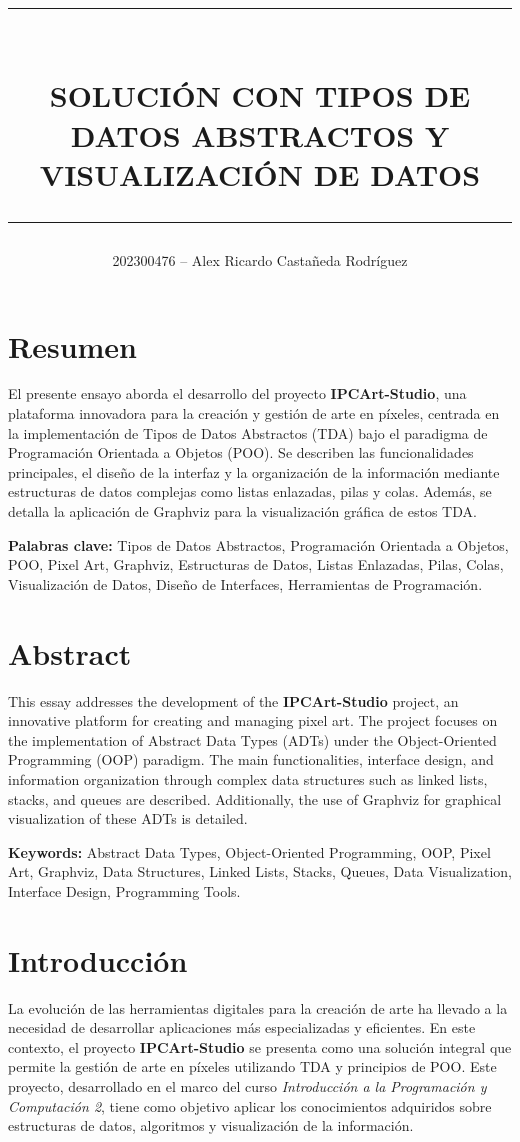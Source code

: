 \documentclass[letterpaper,12pt]{article}
\title{
    \rule{\textwidth}{0.4pt} \\
    \vspace{0.4cm}
    \textbf{SOLUCIÓN CON TIPOS DE DATOS ABSTRACTOS Y VISUALIZACIÓN DE DATOS} \\
    \rule{\textwidth}{0.4pt}
}
\author{202300476 – Alex Ricardo Castañeda Rodríguez}
\date{}
\begin{document}
\maketitle
\vspace{1cm}

\begin{multicols}{2}

    \section*{Resumen}
    El presente ensayo aborda el desarrollo del proyecto \textbf{IPCArt-Studio}, una plataforma innovadora para la creaci\'on y gesti\'on de arte en p\'ixeles, centrada en la implementaci\'on de Tipos de Datos Abstractos (TDA) bajo el paradigma de Programaci\'on Orientada a Objetos (POO). Se describen las funcionalidades principales, el dise\~no de la interfaz y la organizaci\'on de la informaci\'on mediante estructuras de datos complejas como listas enlazadas, pilas y colas. Adem\'as, se detalla la aplicaci\'on de Graphviz para la visualizaci\'on gr\'afica de estos TDA.

    \textbf{Palabras clave:} Tipos de Datos Abstractos, Programación Orientada a Objetos, POO, Pixel Art, Graphviz, Estructuras de Datos, Listas Enlazadas, Pilas, Colas, Visualización de Datos, Diseño de Interfaces, Herramientas de Programación.

    \columnbreak

    \section*{Abstract}
    This essay addresses the development of the \textbf{IPCArt-Studio} project, an innovative platform for creating and managing pixel art. The project focuses on the implementation of Abstract Data Types (ADTs) under the Object-Oriented Programming (OOP) paradigm. The main functionalities, interface design, and information organization through complex data structures such as linked lists, stacks, and queues are described. Additionally, the use of Graphviz for graphical visualization of these ADTs is detailed.

    \textbf{Keywords:} Abstract Data Types, Object-Oriented Programming, OOP, Pixel Art, Graphviz, Data Structures, Linked Lists, Stacks, Queues, Data Visualization, Interface Design, Programming Tools.


    \newpage

    \section*{Introducci\'on}
La evoluci\'on de las herramientas digitales para la creaci\'on de arte ha llevado a la necesidad de desarrollar aplicaciones m\'as especializadas y eficientes. En este contexto, el proyecto \textbf{IPCArt-Studio} se presenta como una soluci\'on integral que permite la gesti\'on de arte en p\'ixeles utilizando TDA y principios de POO. Este proyecto, desarrollado en el marco del curso \textit{Introducci\'on a la Programaci\'on y Computaci\'on 2}, tiene como objetivo aplicar los conocimientos adquiridos sobre estructuras de datos, algoritmos y visualizaci\'on de la informaci\'on.


\end{multicols}
\end{document}
